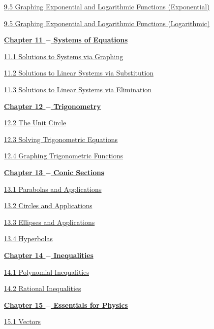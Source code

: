\documentclass[../book.tex]{subfiles}
\begin{document}
\href{https://cdn.kutasoftware.com/Worksheets/Alg2/Graphing%20Exponential%20Functions.pdf}{9.5   Graphing Exponential and Logarithmic Functions (Exponential)}

\href{https://cdn.kutasoftware.com/Worksheets/Alg2/Graphing%20Logarithms.pdf}{9.5   Graphing Exponential and Logarithmic Functions (Logarithmic)}

\noindent \underline{\textbf{Chapter 11 $-$ Systems of Equations}}

\href{https://cdn.kutasoftware.com/Worksheets/Alg2/Systems%20of%20Two%20Equations.pdf}{11.1   Solutions to Systems via Graphing}

\href{https://cdn.kutasoftware.com/Worksheets/Alg2/Systems%20of%20Three%20Equations%20Substitution.pdf}{11.2   Solutions to Linear Systems via Substitution}

\href{https://cdn.kutasoftware.com/Worksheets/Alg2/Systems%20of%20Three%20Equations%20Elimination.pdf}{11.3   Solutions to Linear Systems via Elimination}

\noindent \underline{\textbf{Chapter 12 $-$ Trigonometry}}

\href{https://cdn.kutasoftware.com/Worksheets/Precalc/04%20-%20Trig%20Ratios%20of%20Any%20Angle.pdf}{12.2   The Unit Circle}

\href{https://cdn.kutasoftware.com/Worksheets/Precalc/04%20-%20Simple%20Trig%20Equations.pdf}{12.3   Solving Trigonometric Equations}

\href{https://cdn.kutasoftware.com/Worksheets/Precalc/04%20-%20Graphs%20of%20Trig%20Functions.pdf}{12.4   Graphing Trigonometric Functions}

\noindent \underline{\textbf{Chapter 13 $-$ Conic Sections}}

\href{https://cdn.kutasoftware.com/Worksheets/Precalc/10%20-%20Parabolas.pdf}{13.1  Parabolas and Applications}

\href{https://cdn.kutasoftware.com/Worksheets/Precalc/10%20-%20Circles.pdf}{13.2   Circles and Applications}

\href{https://cdn.kutasoftware.com/Worksheets/Precalc/10%20-%20Ellipses.pdf}{13.3  Ellipses and Applications}

\href{https://cdn.kutasoftware.com/Worksheets/Precalc/10%20-%20Hyperbolas.pdf}{13.4   Hyperbolas}

\noindent \underline{\textbf{Chapter 14 $-$ Inequalities}}

\href{https://cdn.kutasoftware.com/Worksheets/Precalc/02%20-%20Polynomial%20Inequalities.pdf}{14.1  Polynomial Inequalities}

\href{https://cdn.kutasoftware.com/Worksheets/Precalc/02%20-%20Rational%20Inequalities.pdf}{14.2   Rational Inequalities}

\noindent \underline{\textbf{Chapter 15 $-$ Essentials for Physics}}

\href{https://cdn.kutasoftware.com/Worksheets/Precalc/07%20-%20Vector%20Basics.pdf}{15.1   Vectors}
\end{document}
